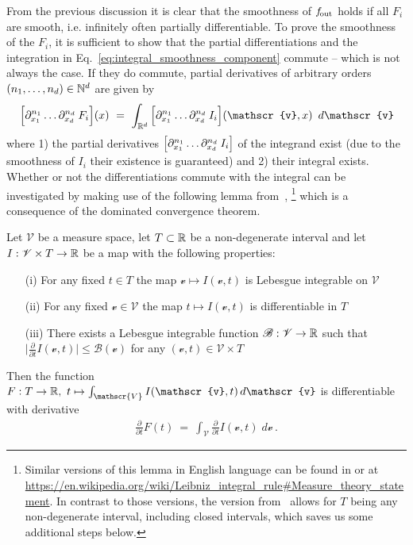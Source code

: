 From the previous discussion it is clear that the smoothness of $f_\textup{\:\!\!out}$ holds if all $F_i$ are smooth, i.e. infinitely often partially differentiable.
To prove the smoothness of the $F_i$, it is sufficient to show that the partial differentiations and the integration in Eq.~\eqref{eq:integral_smoothness_component} commute -- which is not always the case.
If they do commute, partial derivatives of arbitrary orders $(n_1,\dots,n_d) \in \mathbb{N}^d$ are given by
\begin{align}\label{eq:APX_smoothness_partial_diff_swapping}
    \Big[ \partial_{x_1}^{n_1} \dots \partial_{x_d}^{n_d}\: F_i \Big](x)
    \ =\ \int_{\R^d} \Big[ \partial_{x_1}^{n_1} \dots \partial_{x_d}^{n_d}\: I_i\Big] (\mathscr{v},x)\,\ d\mathscr{v}
\end{align}
where
1) the partial derivatives $\pig[ \partial_{x_1}^{n_1} \dots \partial_{x_d}^{n_d}\: I_i\pig]$ of the integrand exist (due to the smoothness of $I_i$ their existence is guaranteed) and
2) their integral exists.
Whether or not the differentiations commute with the integral can be investigated by making use of the following lemma
from~\cite{forster2012analysis3},%
\footnote{
    Similar versions of this lemma in English language can be found in \cite{klenke2006probability} or at
    \url{https://en.wikipedia.org/wiki/Leibniz_integral_rule\#Measure_theory_statement}.
    In contrast to those versions, the version from~\cite{forster2012analysis3} allows for $T$ being any non-degenerate interval, including closed intervals, which saves us some additional steps below.
}
which is a consequence of the dominated convergence theorem.
\begin{thm}
\label{thm:differentiation_lemma}
    Let $\mathscr{V}$ be a measure space, let $T\subset\mathbb{R}$ be a non-degenerate interval and let $I: \mathscr{V} \times T \to \mathbb{R}$ be a map with the following properties:
    \begin{itemize}
        \item[(i)]  For any fixed $t\in T$ the map $\mathscr{v} \mapsto I(\mathscr{v},t)$ is Lebesgue integrable on $\mathscr{V}$
        \item[(ii)] For any fixed $\mathscr{v} \in \mathscr{V}$ the map $t\mapsto I(\mathscr{v},t)$ is differentiable in $T$
        \item[(iii)] There exists a Lebesgue integrable function $\mathscr{B}: \mathscr{V} \to \mathbb{R}$ such that
                    $\big| \frac{\partial}{\partial t} I(\mathscr{v},t) \big| \leq \mathscr{B}(\mathscr{v})$
                    for any $(\mathscr{v},t) \in \mathscr{V} \times T$
    \end{itemize}
     Then the function $F: T \to \R,\ t \mapsto \int_\mathscr{V} I(\mathscr{v},t)\, d\mathscr{v}$ is differentiable
     with derivative
    \begin{align*}
        \frac{\partial}{\partial t} F(t)\ =\ \int_\mathscr{V} \frac{\partial}{\partial t} I(\mathscr{v},t)\; d\mathscr{v} \,.
    \end{align*}
\end{thm}
